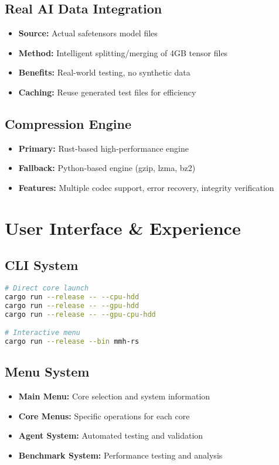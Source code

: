 \documentclass[12pt,a4paper]{article}
\begin{document}
\subsection{Real AI Data Integration}
\begin{itemize}
    \item \textbf{Source:} Actual safetensors model files
    \item \textbf{Method:} Intelligent splitting/merging of 4GB tensor files
    \item \textbf{Benefits:} Real-world testing, no synthetic data
    \item \textbf{Caching:} Reuse generated test files for efficiency
\end{itemize}

\subsection{Compression Engine}
\begin{itemize}
    \item \textbf{Primary:} Rust-based high-performance engine
    \item \textbf{Fallback:} Python-based engine (gzip, lzma, bz2)
    \item \textbf{Features:} Multiple codec support, error recovery, integrity verification
\end{itemize}

\section{User Interface \& Experience}

\subsection{CLI System}
\begin{lstlisting}[language=bash]
# Direct core launch
cargo run --release -- --cpu-hdd
cargo run --release -- --gpu-hdd
cargo run --release -- --gpu-cpu-hdd

# Interactive menu
cargo run --release --bin mmh-rs
\end{lstlisting}

\subsection{Menu System}
\begin{itemize}
    \item \textbf{Main Menu:} Core selection and system information
    \item \textbf{Core Menus:} Specific operations for each core
    \item \textbf{Agent System:} Automated testing and validation
    \item \textbf{Benchmark System:} Performance testing and analysis
\end{itemize}
\end{document}

